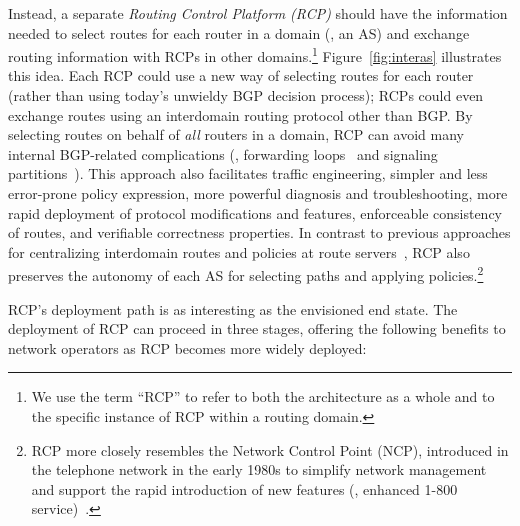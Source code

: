 Instead, a separate {\em Routing Control Platform (RCP)} should have
the information needed to select routes for each router in a domain
(\eg, an AS) and exchange routing information with RCPs in other
domains.\footnote{We use the term ``RCP'' to refer to
both the architecture as a whole and to the specific instance of RCP
within a routing domain.}
Figure~\ref{fig:interas} illustrates this idea.
Each RCP could use a new way of selecting routes for each router
(rather than using today's unwieldy BGP decision process); RCPs 
could even exchange routes using an interdomain routing protocol other
than BGP.  By selecting routes on behalf of {\em all\/} routers in a
domain, RCP can avoid many internal BGP-related complications (\eg,
forwarding loops~\cite{Dube99} and signaling partitions~\cite{Feamster2004h}).
%
This approach also facilitates traffic engineering, simpler and less
error-prone policy expression, more powerful diagnosis and
troubleshooting, more rapid deployment of protocol modifications and
features, enforceable consistency of routes, and verifiable
correctness properties.  
%
In contrast to previous approaches for centralizing interdomain routes
and policies at route servers~\cite{Govindan1998}, RCP also preserves
the autonomy of each AS for selecting paths and applying
policies.\footnote{RCP more closely resembles the
Network Control Point (NCP), introduced in the telephone network in the
early 1980s to simplify network management and support the rapid
introduction of new features (\eg, enhanced 1-800 service)~\cite{Horing82,Lawser82}.}

RCP's deployment path is as interesting
as the envisioned end state.  The deployment of RCP can proceed in
three stages, offering the following benefits to network operators as
RCP becomes more widely deployed:

